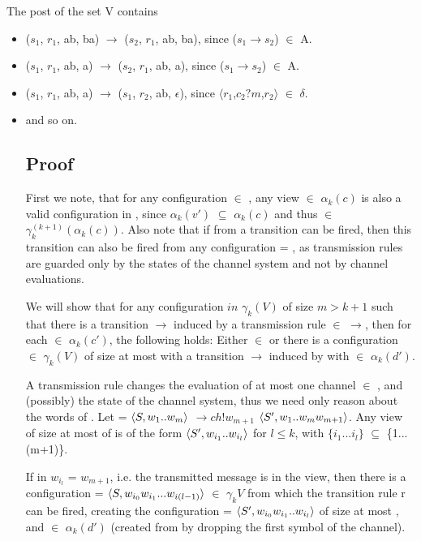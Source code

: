 The post of the set V contains
\begin{itemize}
\item
($s_1$, $r_1$, ab, ba) $\rightarrow$ ($s_2$, $r_1$, ab, ba), since ($s_1$$\rightarrow$$s_2$) $\in$ A.
\item
($s_1$, $r_1$, ab, a) $\rightarrow$ ($s_2$, $r_1$, ab, a), since ($s_1$$\rightarrow$$s_2$) $\in$ A.
\item
($s_1$, $r_1$, ab, a) $\rightarrow$ ($s_1$, $r_2$, ab, $\epsilon$), since $\langle$$r_1$,$c_2?m$,$r_2$$\rangle$ $\in$ $\delta$.
\item
and so on.


\subsection{Proof}
First we note, that for any configuration  $\in$ , any view  $\in$ $\alpha_k(c)$ is also a valid configuration in , since $\alpha_k(v')$ $\subseteq$ $\alpha_k(c)$ and thus  $\in$ $\gamma_k^(k+1)(\alpha_k(c))$. Also note that if from  a transition  can be fired, then this transition can also be fired from any configuration  = , as transmission rules are guarded only by the states of the channel system and not by channel evaluations.

We will show that for any configuration  $in$ $\gamma_k(V)$ of size $m > k + 1$ such that there is a transition  $\rightarrow$  induced by a transmission rule  $\in$ $\rightarrow$, then for each  $\in$ $\alpha_k(c')$, the following holds: Either  $\in$  or there is a configuration  $\in$ $\gamma_k(V)$ of size at most  with a transition  $\rightarrow$  induced by  with  $\in$ $\alpha_k(d')$.

A transmission rule changes the evaluation of at most one channel  $\in$ , and (possibly) the state of the channel system, thus we need only reason about the words of .
Let  = $\langle S, w_1..w_m\rangle$ $\rightarrow{ch!w_{m+1}}$  $\langle S', w_1..w_mw_{m+1}\rangle$. Any view  of size at most  of  is of the form $\langle S',w_{i_1}..w_{i_l}\rangle$ for $l \leq k$, with $\{i_1...i_l\}$ $\subseteq$ \{1...(m+1)\}.

If in  $w_{i_l}$ = $w_{m+1}$, i.e. the transmitted message is in the view, then there is a configuration  = $\langle S, w_{i_0}w_{i_1}...w_{i(l-1)}\rangle$ $\in$ $\gamma_k{V}$ from which the transition rule r can be fired, creating the configuration  = $\langle S', w_{i_0}w_{i_1}..w_{i_l}\rangle$ of size at most , and  $\in$ $\alpha_k(d')$ (created from  by dropping the first symbol of the channel).


\end{itemize}

